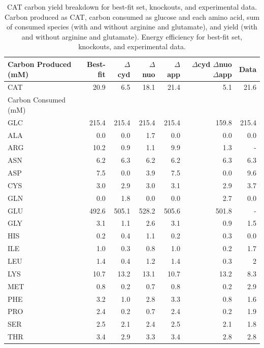 \documentclass[12pt]{article}
\begin{document}
\begin{table}
\centering
    \caption{CAT carbon yield breakdown for best-fit set, knockouts, and experimental data. Carbon produced as CAT, carbon consumed as glucose and each amino acid, sum of consumed species (with and without arginine and glutamate), and yield  (with and without arginine and glutamate). Energy efficiency for best-fit set, knockouts, and experimental data.}
    \renewcommand{\arraystretch}{1.25}
    \begin{tabular}{lrrrrrr} \toprule
        Carbon Produced (mM) & Best-fit & $\Delta$cyd & $\Delta$nuo & $\Delta$app & $\Delta$cyd $\Delta$nuo $\Delta$app & Data \\ \hline
        CAT & 20.9 & 6.5 & 18.1 & 21.4 & 5.1 & 21.6 \\ \midrule
        Carbon Consumed (mM) \\ \hline
        GLC & 215.4 & 215.4 & 215.4 & 215.4 & 159.8 & 215.4 \\ \hline
        ALA & 0.0 & 0.0 & 1.7 & 0.0 & 0.0 & 0.0 \\ \hline
        ARG & 10.2 & 0.9 & 1.1 & 9.9 & 1.3 & - \\ \hline
        ASN & 6.2 & 6.3 & 6.2 & 6.2 & 6.3 & 6.3 \\ \hline
        ASP & 7.5 & 0.0 & 3.9 & 7.5 & 0.0 & 9.6 \\ \hline
        CYS & 3.0 & 2.9 & 3.0 & 3.1 & 2.9 & 3.7 \\ \hline
        GLN & 0.0 & 1.8 & 0.0 & 0.0 & 2.7 & 0.0 \\ \hline
        GLU & 492.6 & 505.1 & 528.2 & 505.6 & 501.8 & - \\ \hline
        GLY & 3.1 & 1.1 & 2.6 & 3.1 & 0.9 & 1.5 \\ \hline
        HIS & 0.2 & 0.4 & 1.1 & 0.2 & 0.3 & 0.0 \\ \hline
        ILE & 1.0 & 0.3 & 0.8 & 1.0 & 0.2 & 1.7 \\ \hline
        LEU & 1.4 & 0.4 & 1.2 & 1.4 & 0.3 & 2 \\ \hline
        LYS & 10.7 & 13.2 & 13.1 & 10.7 & 13.2 & 8.3 \\ \hline
        MET & 0.8 & 0.2 & 0.7 & 0.8 & 0.2 & 2.9 \\ \hline
        PHE & 3.2 & 1.0 & 2.8 & 3.3 & 0.8 & 1.6 \\ \hline
        PRO & 2.4 & 0.2 & 0.7 & 2.4 & 0.2 & 1.9 \\ \hline
        SER & 2.5 & 2.1 & 2.4 & 2.5 & 2.1 & 1.8 \\ \hline
        THR & 3.4 & 2.9 & 3.3 & 3.4 & 2.8 & 2.8 \\ \hline

\end{tabular}
\end{table}
\end{document}
